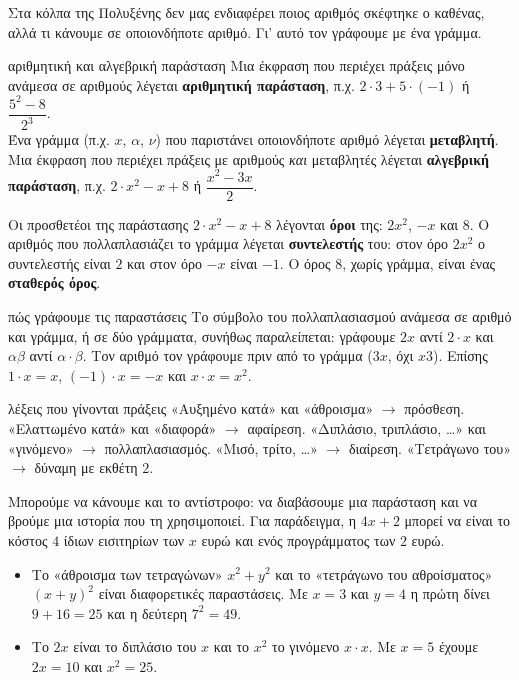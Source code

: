 

Στα κόλπα της Πολυξένης δεν μας ενδιαφέρει ποιος αριθμός σκέφτηκε ο καθένας, αλλά τι κάνουμε σε οποιονδήποτε αριθμό. Γι' αυτό τον γράφουμε με ένα γράμμα.

\begin{orismos}{αριθμητική και αλγεβρική παράσταση}
Μια έκφραση που περιέχει πράξεις μόνο ανάμεσα σε αριθμούς λέγεται \textbf{αριθμητική παράσταση}, π.χ. $2\cdot3+5\cdot(-1)$ ή $\dfrac{5^2-8}{2^3}$.\\
Ένα γράμμα (π.χ. $x$, $\alpha$, $\nu$) που παριστάνει οποιονδήποτε αριθμό λέγεται \textbf{μεταβλητή}. Μια έκφραση που περιέχει πράξεις με αριθμούς \emph{και} μεταβλητές λέγεται \textbf{αλγεβρική παράσταση}, π.χ. $2\cdot x^2-x+8$ ή $\dfrac{x^2-3x}{2}$.
\end{orismos}

Οι προσθετέοι της παράστασης $2\cdot x^2-x+8$ λέγονται \textbf{όροι} της: $2x^2$, $-x$ και $8$. Ο αριθμός που πολλαπλασιάζει το γράμμα λέγεται \textbf{συντελεστής} του: στον όρο $2x^2$ ο συντελεστής είναι $2$ και στον όρο $-x$ είναι $-1$. Ο όρος $8$, χωρίς γράμμα, είναι ένας \textbf{σταθερός όρος}.

\begin{kanonas}{πώς γράφουμε τις παραστάσεις}
Το σύμβολο του πολλαπλασιασμού ανάμεσα σε αριθμό και γράμμα, ή σε δύο γράμματα, συνήθως παραλείπεται: γράφουμε $2x$ αντί $2\cdot x$ και $\alpha\beta$ αντί $\alpha\cdot\beta$. Τον αριθμό τον γράφουμε πριν από το γράμμα ($3x$, όχι $x3$). Επίσης $1\cdot x=x$, $(-1)\cdot x=-x$ και $x\cdot x=x^2$.
\end{kanonas}

\begin{kanonas}{λέξεις που γίνονται πράξεις}
«Αυξημένο κατά» και «άθροισμα» $\to$ πρόσθεση. «Ελαττωμένο κατά» και «διαφορά» $\to$ αφαίρεση. «Διπλάσιο, τριπλάσιο, \dots» και «γινόμενο» $\to$ πολλαπλασιασμός. «Μισό, τρίτο, \dots» $\to$ διαίρεση. «Τετράγωνο του» $\to$ δύναμη με εκθέτη $2$.
\end{kanonas}

Μπορούμε να κάνουμε και το αντίστροφο: να διαβάσουμε μια παράσταση και να βρούμε μια ιστορία που τη χρησιμοποιεί. Για παράδειγμα, η $4x+2$ μπορεί να είναι το κόστος $4$ ίδιων εισιτηρίων των $x$ ευρώ και ενός προγράμματος των $2$ ευρώ.

\begin{prosoxi}
\begin{itemize}[leftmargin=1.2em,itemsep=0.3ex,topsep=2pt]
\item Το «άθροισμα των τετραγώνων» $x^2+y^2$ και το «τετράγωνο του αθροίσματος» $(x+y)^2$ είναι διαφορετικές παραστάσεις. Με $x=3$ και $y=4$ η πρώτη δίνει $9+16=25$ και η δεύτερη $7^2=49$.
\item Το $2x$ είναι το διπλάσιο του $x$ και το $x^2$ το γινόμενο $x\cdot x$. Με $x=5$ έχουμε $2x=10$ και $x^2=25$.
\end{itemize}
\end{prosoxi}

